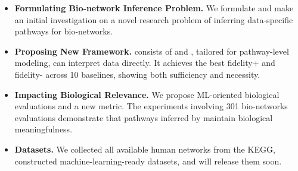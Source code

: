 \begin{itemize}[left=0pt]
\item \textbf{Formulating Bio-network Inference Problem.}
We formulate and make an initial investigation on a novel research problem of inferring data-specific pathways for bio-networks.

\item \textbf{Proposing New Framework.}
\method consists of \classifier and \explainer, tailored for pathway-level modeling, can interpret data directly.
It achieves the best fidelity+ and fidelity- across 10 baselines, showing both sufficiency and necessity.



\item \textbf{Impacting Biological Relevance.}
We propose ML-oriented biological evaluations and a new metric.
The experiments involving 301 bio-networks evaluations demonstrate that pathways inferred by \method maintain biological meaningfulness.


\item \textbf{Datasets.}
We collected all available human networks from the KEGG, constructed machine-learning-ready datasets, and will release them soon.

\end{itemize}



